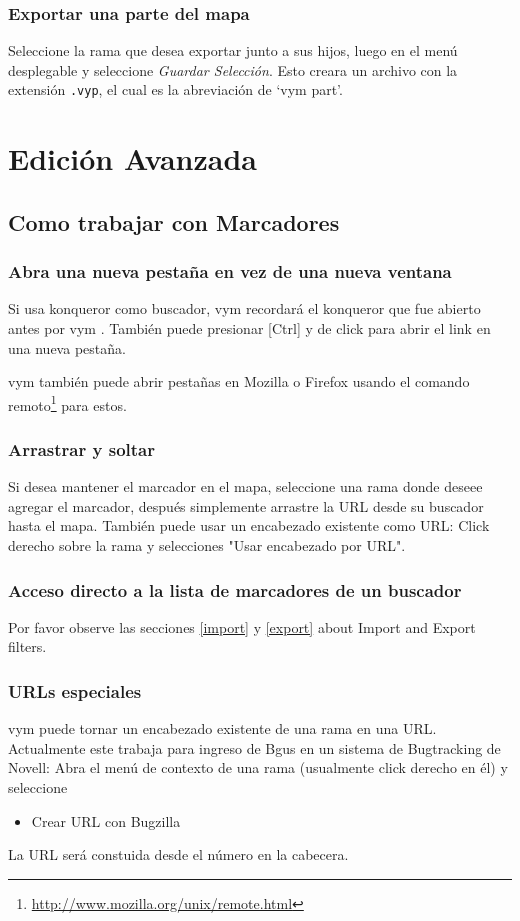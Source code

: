 \documentclass{article}
\newcommand{\vym}{{\sc vym }}
\newcommand{\key}[1]{[#1]}
\begin{document}
\subsubsection*{Exportar una parte del mapa}
Seleccione la rama que desea exportar junto a sus hijos, luego en el men\'u desplegable y seleccione {\em Guardar Selecci\'on}. Esto creara un archivo con la extensi\'on {\tt .vyp}, el cual es la abreviaci\'on de \lq \vym part\rq.

\section{Edici\'on Avanzada}

\subsection{Como trabajar con Marcadores} \label{bookmarks}
\subsubsection*{Abra una nueva pesta\~na en vez de una nueva ventana}
Si usa konqueror como buscador, \vym recordar\'a el konqueror que fue abierto antes por \vym. Tambi\'en puede presionar \key{Ctrl} y de click para abrir el link en una nueva pesta\~na.

\vym tambi\'en puede abrir pesta\~nas en Mozilla o Firefox usando el comando remoto\footnote{\href{http://www.mozilla.org/unix/remote.html}{http://www.mozilla.org/unix/remote.html}}
para estos.

\subsubsection*{Arrastrar y soltar}
Si desea mantener el marcador en el mapa, seleccione una rama donde deseee agregar el marcador,
despu\'es simplemente arrastre la URL desde su buscador hasta el mapa. Tambi\'en puede usar un encabezado existente como 
URL: Click derecho sobre la rama y selecciones "Usar encabezado por URL".

\subsubsection*{Acceso directo a la lista de marcadores de un buscador}
Por favor observe las secciones \ref{import} y \ref{export} about
Import and Export filters.

\subsubsection*{URLs especiales}
\vym puede tornar un encabezado existente de una rama en una URL. Actualmente
este trabaja para ingreso de Bgus en un sistema de Bugtracking de Novell: Abra el 
men\'u de contexto de una rama (usualmente click derecho en \'el) y seleccione
\begin{itemize}
	\item Crear URL con Bugzilla
\end{itemize}
La URL ser\'a constuida desde el n\'umero en la cabecera.
\end{document}
